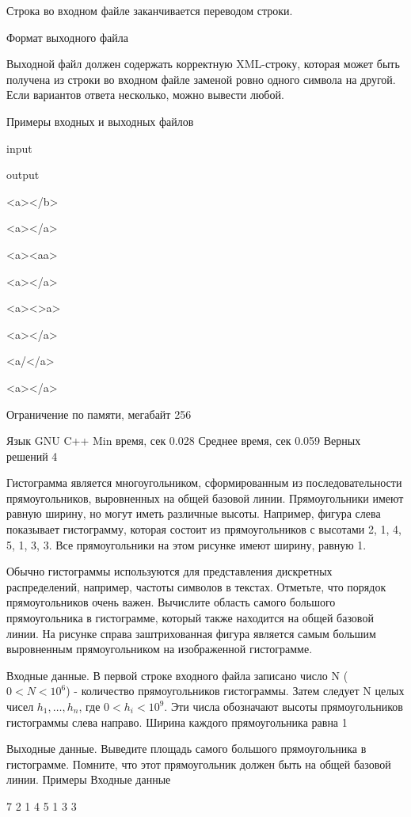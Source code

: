 \documentclass[]{article}
\begin{document}
Строка во входном файле заканчивается переводом строки.

Формат выходного файла

Выходной файл должен содержать корректную XML-строку, которая может быть получена из строки во входном файле заменой ровно одного символа на другой. Если вариантов ответа несколько, можно вывести любой.

Примеры входных и выходных файлов

input
	

output

<a></b>
	

<a></a>

<a><aa>
	

<a></a>

<a><>a>
	

<a></a>

<a/</a>
	

<a></a>


Ограничение по памяти, мегабайт	256
	
Язык	GNU C++
Min время, сек	0.028
Среднее время, сек	0.059
Верных решений	4

Гистограмма является многоугольником, сформированным из последовательности прямоугольников, выровненных на общей базовой линии. Прямоугольники имеют равную ширину, но могут иметь различные высоты. Например, фигура слева показывает гистограмму, которая состоит из прямоугольников с высотами 2, 1, 4, 5, 1, 3, 3. Все прямоугольники на этом рисунке имеют ширину, равную 1.

Обычно гистограммы используются для представления дискретных распределений, например, частоты символов в текстах. Отметьте, что порядок прямоугольников очень важен. Вычислите область самого большого прямоугольника в гистограмме, который также находится на общей базовой линии. На рисунке справа заштрихованная фигура является самым большим выровненным прямоугольником на изображенной гистограмме.

Входные данные. В первой строке входного файла записано число N ($0 < N < 10^6$) - количество прямоугольников гистограммы. Затем следует N целых чисел $h_1,\ldots,h_n$, где $0<h_i<10^9$. Эти числа обозначают высоты прямоугольников гистограммы слева направо. Ширина каждого прямоугольника равна 1

Выходные данные. Выведите площадь самого большого прямоугольника в гистограмме. Помните, что этот прямоугольник должен быть на общей базовой линии.
Примеры
Входные данные

7 2 1 4 5 1 3 3
\end{document}
